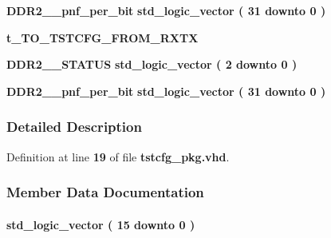 \begin{DoxyCompactItemize}
\item 
{\bf D\+D\+R2\+\_\+\_\+pnf\+\_\+per\+\_\+bit} {\bfseries {\bfseries \textcolor{comment}{std\+\_\+logic\+\_\+vector}\textcolor{vhdlchar}{ }\textcolor{vhdlchar}{(}\textcolor{vhdlchar}{ }\textcolor{vhdlchar}{ } \textcolor{vhdldigit}{31} \textcolor{vhdlchar}{ }\textcolor{keywordflow}{downto}\textcolor{vhdlchar}{ }\textcolor{vhdlchar}{ } \textcolor{vhdldigit}{0} \textcolor{vhdlchar}{ }\textcolor{vhdlchar}{)}\textcolor{vhdlchar}{ }}} 
\item 
{\bf t\+\_\+\+T\+O\+\_\+\+T\+S\+T\+C\+F\+G\+\_\+\+F\+R\+O\+M\+\_\+\+R\+X\+TX} {\bfseries  }
\item 
{\bf D\+D\+R2\+\_\+\_\+\+S\+T\+A\+T\+US} {\bfseries {\bfseries \textcolor{comment}{std\+\_\+logic\+\_\+vector}\textcolor{vhdlchar}{ }\textcolor{vhdlchar}{(}\textcolor{vhdlchar}{ }\textcolor{vhdlchar}{ } \textcolor{vhdldigit}{2} \textcolor{vhdlchar}{ }\textcolor{keywordflow}{downto}\textcolor{vhdlchar}{ }\textcolor{vhdlchar}{ } \textcolor{vhdldigit}{0} \textcolor{vhdlchar}{ }\textcolor{vhdlchar}{)}\textcolor{vhdlchar}{ }}} 
\item 
{\bf D\+D\+R2\+\_\+\_\+pnf\+\_\+per\+\_\+bit} {\bfseries {\bfseries \textcolor{comment}{std\+\_\+logic\+\_\+vector}\textcolor{vhdlchar}{ }\textcolor{vhdlchar}{(}\textcolor{vhdlchar}{ }\textcolor{vhdlchar}{ } \textcolor{vhdldigit}{31} \textcolor{vhdlchar}{ }\textcolor{keywordflow}{downto}\textcolor{vhdlchar}{ }\textcolor{vhdlchar}{ } \textcolor{vhdldigit}{0} \textcolor{vhdlchar}{ }\textcolor{vhdlchar}{)}\textcolor{vhdlchar}{ }}} 
\end{DoxyCompactItemize}


\subsubsection{Detailed Description}


Definition at line {\bf 19} of file {\bf tstcfg\+\_\+pkg.\+vhd}.



\subsubsection{Member Data Documentation}
\paragraph[{A\+D\+F\+\_\+\+C\+NT}]{ {\bfseries \textcolor{comment}{std\+\_\+logic\+\_\+vector}\textcolor{vhdlchar}{ }\textcolor{vhdlchar}{(}\textcolor{vhdlchar}{ }\textcolor{vhdlchar}{ } \textcolor{vhdldigit}{15} \textcolor{vhdlchar}{ }\textcolor{keywordflow}{downto}\textcolor{vhdlchar}{ }\textcolor{vhdlchar}{ } \textcolor{vhdldigit}{0} \textcolor{vhdlchar}{ }\textcolor{vhdlchar}{)}\textcolor{vhdlchar}{ }} \hspace{0.3cm}{\ttfamily [Record]}}\label{clasststcfg__pkg_a8359cf6dd5857abf07383f69c6357e9a}


